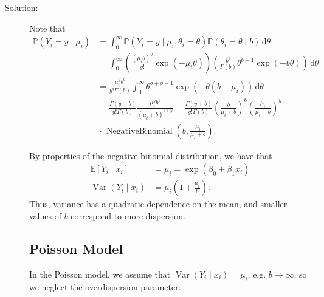 \documentclass[letterpaper,11pt]{article}
\begin{document}
\begin{enumerate}
  \begin{description}
  \item[Solution:] Note that
    \begin{align}
      \mathbb{P}\left(
      Y_i = y \mid \mu_i
      \right)
      &= \int_0^\infty\mathbb{P}\left(
      Y_i = y \mid \mu_i, \theta_i = \theta
      \right)\mathbb{P}\left(
      \theta_i = \theta
      \mid b
        \right)
        \,\mathrm{d}\theta \nonumber\\
      &= \int_0^\infty
        \left(
        \frac{\left(\mu_i\theta\right)^y}{y!}\exp\left(-\mu_i\theta\right)
        \right)
        \left(
        \frac{b^b}{\Gamma(b)}\theta^{b-1}
        \exp\left(-b\theta\right)
        \right)        
        \,\mathrm{d}\theta \nonumber\\
      &= \frac{\mu_i^y b^b}{y!\Gamma(b)}
        \int_0^\infty
        \theta^{b + y - 1}\exp\left(-\theta(b + \mu_i)\right)
        \,\mathrm{d}\theta \nonumber\\
      &= \frac{\Gamma(y + b)}{y!\Gamma(b)}
        \frac{\mu_i^y b^b}{\left(\mu_i + b\right)^{b + y}}
        = \frac{\Gamma(y + b)}{y!\Gamma(b)}
        \left(\frac{b}{\mu_i + b}\right)^b
        \left(\frac{\mu_i}{\mu_i + b}\right)^y
        \nonumber\\
      &\sim \operatorname{NegativeBinomial}\left(
        b,
        \frac{\mu_i}{\mu_i + b}
        \right).
        \label{eqn:p1_negative_binomial}
    \end{align}

    By properties of the negative binomial distribution, we have that
    \begin{align}
      \mathbb{E}\left[
      Y_i
      \mid x_i
      \right]
      &= \mu_i = \exp\left(\beta_0 + \beta_1x_i\right) \nonumber\\
      \operatorname{Var}\left(Y_i \mid x_i\right)
      &= \mu_i\left(
        1 + \frac{\mu_i}{b}
        \right).
      \label{eqn:p1_y_mean_variance}
    \end{align}
    Thus, variance has a quadratic dependence on the mean, and smaller values of
    $b$ correspond to more dispersion.

    \subsection*{Poisson Model}

    In the Poisson model, we assume that
    $\operatorname{Var}\left(Y_i \mid x_i\right) = \mu_i$, e.g.
    $b \rightarrow \infty$, so we neglect the overdispersion parameter.


\end{description}
\end{enumerate}
\end{document}
